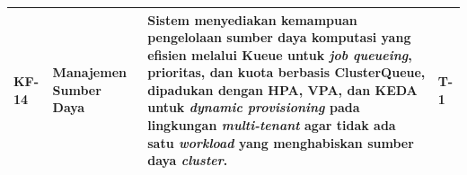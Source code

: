 {\begin{longtable}{|>{\centering\arraybackslash}m{0.75cm}|m{2cm}|m{8.55cm}|>{\centering\arraybackslash}m{1.75cm}|}
\hline
KF-14 & Manajemen Sumber Daya & Sistem menyediakan kemampuan pengelolaan sumber daya komputasi yang efisien melalui Kueue untuk \textit{job queueing}, prioritas, dan kuota berbasis ClusterQueue, dipadukan dengan HPA, VPA, dan KEDA untuk \textit{dynamic provisioning} pada lingkungan \textit{multi-tenant} agar tidak ada satu \textit{workload} yang menghabiskan sumber daya \textit{cluster}. & T-1 \\
\hline
\end{longtable}
}